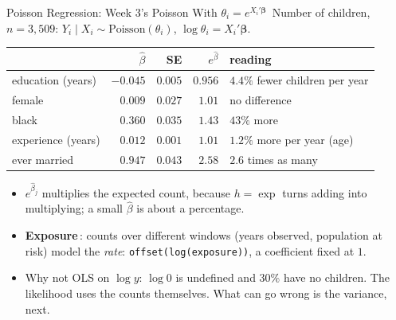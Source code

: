 \documentclass[aspectratio=169,11pt,xcolor=dvipsnames]{beamer}
\newcommand{\adv}{\,\raisebox{0.6pt}{\textcolor{accent}{$\bigstar$}}}
\newcommand{\core}{\,\raisebox{0.6pt}{\textcolor{corestar}{$\bigstar$}}}
\begin{document}
\begin{frame}{Poisson Regression: Week 3's Poisson With $\theta_i = e^{X_i'\bm\beta}$\core}
Number of children, $n = 3{,}509$:
$Y_i \mid X_i \sim \text{Poisson}(\theta_i)$, $\log\theta_i = X_i'\bm\beta$.
\begin{center}\small
\renewcommand{\arraystretch}{1.05}
\begin{tabular}{lrrrl}
\toprule
 & $\hat\beta$ & SE & $e^{\hat\beta}$ & reading \\
\midrule
education (years) & $-0.045$ & $0.005$ & $0.956$ & $4.4\%$ fewer children per year \\
female & $0.009$ & $0.027$ & $1.01$ & no difference \\
black & $0.360$ & $0.035$ & $1.43$ & $43\%$ more \\
experience (years) & $0.012$ & $0.001$ & $1.01$ & $1.2\%$ more per year (age) \\
ever married & $0.947$ & $0.043$ & $2.58$ & $2.6$ times as many \\
\bottomrule
\end{tabular}
\end{center}
\vskip2pt
\begin{itemize}\itemsep2pt
  \item $e^{\hat\beta_j}$ multiplies the expected count, because
        $h = \exp$ turns adding into multiplying; a small $\hat\beta$ is
        about a percentage.
  \item \textbf{Exposure}\adv: counts over different windows (years observed,
        population at risk) model the \emph{rate}:
        \texttt{offset(log(exposure))}, a coefficient fixed at $1$.
  \item Why not OLS on $\log y$: $\log 0$ is undefined and $30\%$ have no
        children. The likelihood uses the counts themselves. What can go
        wrong is the variance, next.
\end{itemize}
\end{frame}
\end{document}
